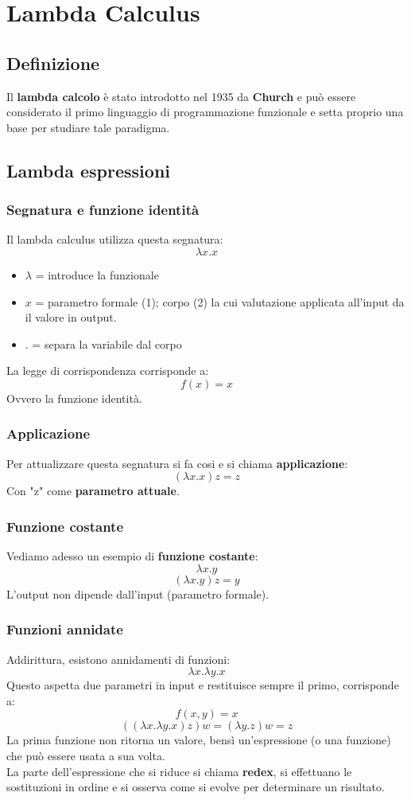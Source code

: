 \documentclass[12pt,a4paper]{article}
\let\oldsection\section
\renewcommand{\section}{\clearpage\oldsection}
\begin{document}
\section{Lambda Calculus}
\subsection{Definizione}
Il \textbf{lambda calcolo} è stato introdotto nel 1935 da \textbf{Church} e può essere considerato il primo linguaggio di programmazione funzionale e setta proprio una base per studiare tale paradigma.
\subsection{Lambda espressioni}
\subsubsection{Segnatura e funzione identità}
Il lambda calculus utilizza questa segnatura:
\[
\lambda x.x
\]
\begin{itemize}
  \item $\lambda$ = introduce la funzionale
  \item $x$ = parametro formale (1); corpo (2) la cui valutazione applicata all'input da il valore in output.
  \item . = separa la variabile dal corpo
\end{itemize}
La legge di corrispondenza corrisponde a:
\[
f(x) = x
\]
Ovvero la funzione identità.\\
\subsubsection{Applicazione}
Per attualizzare questa segnatura si fa cosi e si chiama \textbf{applicazione}:
\[
(\lambda x.x)z = z
\]
Con "z" come \textbf{parametro attuale}.
\subsubsection{Funzione costante}
Vediamo adesso un esempio di \textbf{funzione costante}:
\[
\lambda x.y
\]
\[
(\lambda x.y)z = y
\]
L'output non dipende dall'input (parametro formale).
\subsubsection{Funzioni annidate}
Addirittura, esistono annidamenti di funzioni:
\[
\lambda x.\lambda y.x
\]
Questo aspetta due parametri in input e restituisce sempre il primo, corrisponde a:
\[
f(x,y) = x
\]
\[
((\lambda x.\lambda y.x)z)w = (\lambda y.z)w = z
\]
La prima funzione non ritorna un valore, bensì un'espressione (o una funzione) che può essere usata a sua volta.\\
La parte dell'espressione che si riduce si chiama \textbf{redex}, si effettuano le sostituzioni in ordine e si osserva come si evolve per determinare un risultato.
\end{document}
